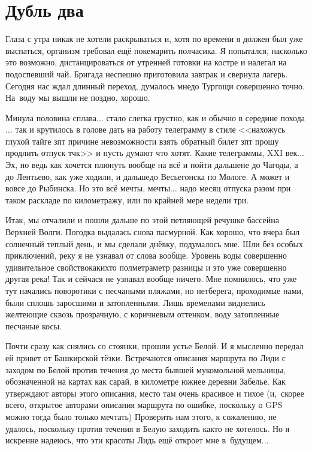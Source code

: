 \chapter{Дубль два} 
\vepsianrose

Глаза с утра никак не хотели раскрываться и, хотя по времени я должен был уже выспаться, организм требовал ещё покемарить полчасика. Я попытался, насколько это возможно, дистанцироваться от утренней готовки на костре и налегал на подоспевший чай. Бригада неспешно приготовила завтрак и свернула лагерь. Сегодня нас ждал длинный переход, думалось мне\mdash до Тургощи совершенно точно. На~воду мы вышли не поздно, хорошо.  

Минула половина сплава$\ldots$ стало слегка грустно, как и обычно в середине похода$\ldots$ так и крутилось в голове дать на работу телеграмму в стиле <<нахожусь глухой тайге зпт причине невозможности взять обратный билет зпт прошу продлить отпуск тчк>> и пусть думают что хотят. Какие телеграммы, XXI век$\ldots$ Эх, но ведь как хочется плюнуть вообще на всё и пойти дальше\mdash не до Чагоды, а до Лентьево, как уже ходили, и дальше\mdash до Весьегонска по Мологе. А может и вовсе до Рыбинска. Но это всё мечты, мечты$\ldots$ надо месяц отпуска разом при таком раскладе по километражу, или по крайней мере недели три.

Итак, мы отчалили и пошли дальше по этой петляющей речушке бассейна Верхней Волги. Погодка выдалась снова пасмурной. Как хорошо, что вчера был солнечный теплый день, и мы сделали днёвку, подумалось мне. Шли без особых приключений, реку я не узнавал от слова вообще. Уровень воды совершенно удивительное свойство\mdash каких\sdash то полметра\sdash метр разницы и это уже совершенно другая река! Так и сейчас\mdash я не узнавал вообще ничего. Мне помнилось, что уже тут начались поворотики с песчаными пляжами, но нет\mdash берега, проходимые нами, были сплошь заросшими и затопленными. Лишь временами виднелись желтеющие сквозь прозрачную, с коричневым оттенком, воду затопленные песчаные косы.

Почти сразу как снялись со стоянки, прошли устье Белой. И я мысленно передал ей привет от Башкирской тёзки. Встречаются описания маршрута по Лиди с заходом по Белой против течения до места бывшей мукомольной мельницы, обозначенной на картах как сарай, в километре южнее деревни Забелье. Как утверждают авторы этого описания, место там очень красивое и тихое (и,~скорее всего, открытое авторами описания маршрута по ошибке, поскольку о GPS можно тогда было только мечтать) Проверить нам этого, к сожалению, не удалось, поскольку против течения в Белую заходить как\sdash то не хотелось. Но я искренне надеюсь, что эти красоты Лидь ещё откроет мне в~будущем$\ldots$

